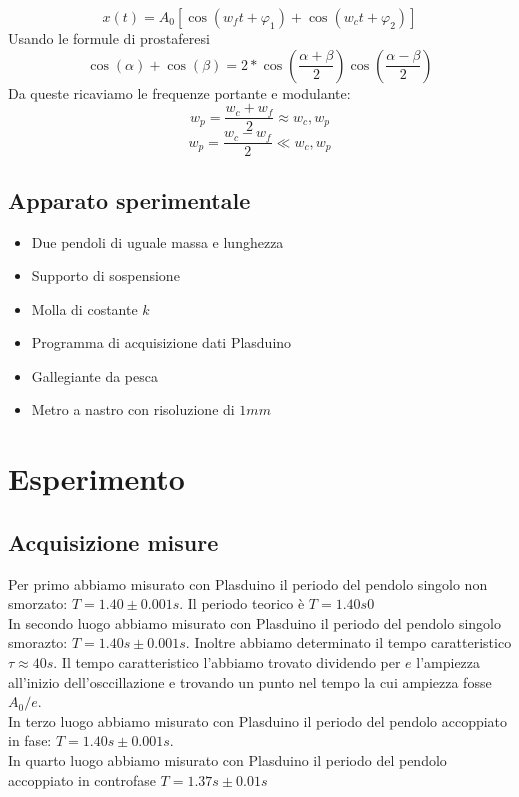 \documentclass[a4paper,10pt]{article}
\begin{document}
\begin{equation}
 x(t)=A_0[\cos(w_ft+\varphi_1)+\cos(w_ct+\varphi_2)]
\end{equation}
Usando le formule di prostaferesi
\begin{equation}
 \cos(\alpha)+\cos(\beta)=2*\cos(\frac{\alpha+\beta}{2})\cos(\frac{\alpha-\beta}{2})
\end{equation}
Da queste ricaviamo le frequenze portante e modulante:
\begin{equation}
 w_p=\frac{w_c+w_f}{2}\approx w_c, w_p
\end{equation}
\begin{equation}
 w_p=\frac{w_c-w_f}{2} \ll w_c, w_p
\end{equation}

\subsection{Apparato sperimentale}
\begin{itemize}
\item{Due pendoli di uguale massa e lunghezza}
\item{Supporto di sospensione}
\item{Molla di costante $k$}
\item{Programma di acquisizione dati Plasduino}
\item{Gallegiante da pesca}
\item{Metro a nastro con risoluzione di $1 mm$}
\end{itemize}

\section{Esperimento}
\subsection{Acquisizione misure}
Per primo abbiamo misurato con Plasduino il periodo del pendolo singolo non smorzato: $T=1.40\pm0.001s$. Il periodo teorico è $T=1.40s0$
\\In secondo luogo abbiamo misurato con Plasduino il periodo del pendolo singolo smorazto: $T=1.40s\pm0.001s$. Inoltre abbiamo determinato il tempo caratteristico $\tau\approx40s$.
Il tempo caratteristico l'abbiamo trovato dividendo per $e$ l'ampiezza all'inizio dell'osccillazione e trovando un punto nel tempo la cui ampiezza fosse $A_0/e$.
\\In terzo luogo abbiamo misurato con Plasduino il periodo del pendolo accoppiato in fase: $T=1.40s\pm0.001s$.
\\In quarto luogo abbiamo misurato con Plasduino il periodo del pendolo accoppiato in controfase $T=1.37s\pm0.01s$
\end{document}
